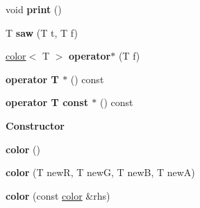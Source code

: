 \begin{DoxyCompactItemize}
\item 
\hypertarget{classgru_1_1Color_1_1color_a95f2e8abbf0acdd2d3a12fb32de0fea4}{void {\bfseries print} ()}\label{classgru_1_1Color_1_1color_a95f2e8abbf0acdd2d3a12fb32de0fea4}

\item 
\hypertarget{classgru_1_1Color_1_1color_a38237857b218f7991a455e2d8a1b8994}{\-T {\bfseries saw} (\-T t, \-T f)}\label{classgru_1_1Color_1_1color_a38237857b218f7991a455e2d8a1b8994}

\item 
\hypertarget{classgru_1_1Color_1_1color_a218d3ce44f31843b020d23bf7a3ca79e}{\hyperlink{classgru_1_1Color_1_1color}{color}$<$ \-T $>$ {\bfseries operator$\ast$} (\-T f)}\label{classgru_1_1Color_1_1color_a218d3ce44f31843b020d23bf7a3ca79e}

\item 
\hypertarget{classgru_1_1Color_1_1color_a313322adec4e18f44c5a97566bcf22f9}{{\bfseries operator T $\ast$} () const }\label{classgru_1_1Color_1_1color_a313322adec4e18f44c5a97566bcf22f9}

\item 
\hypertarget{classgru_1_1Color_1_1color_a58095907ad44f8311d08ae3044a8aad9}{{\bfseries operator T const $\ast$} () const }\label{classgru_1_1Color_1_1color_a58095907ad44f8311d08ae3044a8aad9}

\end{DoxyCompactItemize}
\begin{Indent}{\bf \-Constructor}\par
\begin{DoxyCompactItemize}
\item 
\hypertarget{classgru_1_1Color_1_1color_af33c28922a46caea8ea72e565bed12d2}{{\bfseries color} ()}\label{classgru_1_1Color_1_1color_af33c28922a46caea8ea72e565bed12d2}

\item 
\hypertarget{classgru_1_1Color_1_1color_a369c6f498495e8a2fe89c0f8cf086cba}{{\bfseries color} (\-T new\-R, \-T new\-G, \-T new\-B, \-T new\-A)}\label{classgru_1_1Color_1_1color_a369c6f498495e8a2fe89c0f8cf086cba}

\item 
\hypertarget{classgru_1_1Color_1_1color_a0b1f7438d1b0f90e26a402e6a3e70f8d}{{\bfseries color} (const \hyperlink{classgru_1_1Color_1_1color}{color} \&rhs)}\label{classgru_1_1Color_1_1color_a0b1f7438d1b0f90e26a402e6a3e70f8d}

\end{DoxyCompactItemize}
\end{Indent}
